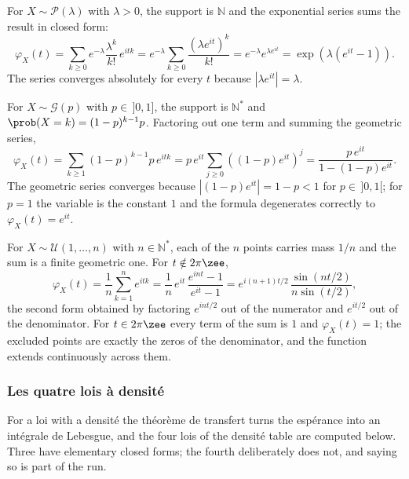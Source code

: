 \begin{example}
For $X \sim \mathcal{P}(\lambda)$ with $\lambda > 0$, the support is $\mathbb{N}$ and the
exponential series sums the result in closed form:
\[
  \varphi_{X}(t) = \sum_{k \geq 0} e^{-\lambda}\frac{\lambda^{k}}{k!}\,e^{itk} =
  e^{-\lambda} \sum_{k \geq 0} \frac{\left(\lambda e^{it}\right)^{k}}{k!} = e^{-\lambda}
  e^{\lambda e^{it}} = \exp\!\left(\lambda\left(e^{it} - 1\right)\right).
\]
The series converges absolutely for every $t$ because $\left|\lambda e^{it}\right| =
\lambda$.
\end{example}

\begin{example}
For $X \sim \mathcal{G}(p)$ with $p \in\, ]0,1]$, the support is $\mathbb{N}^{*}$ and
$\prob(X = k) = (1-p)^{k-1}p$. Factoring out one term and summing the geometric series,
\[
  \varphi_{X}(t) = \sum_{k \geq 1} (1-p)^{k-1} p\, e^{itk} = p\,e^{it} \sum_{j \geq 0}
  \left((1-p)e^{it}\right)^{j} = \frac{p\,e^{it}}{1 - (1-p)e^{it}}.
\]
The geometric series converges because $\left|(1-p)e^{it}\right| = 1 - p < 1$ for $p \in\,
]0,1[$; for $p = 1$ the variable is the constant $1$ and the formula degenerates correctly
to $\varphi_{X}(t) = e^{it}$.
\end{example}

\begin{example}
For $X \sim \mathcal{U}(1,\dots,n)$ with $n \in \mathbb{N}^{*}$, each of the $n$ points
carries mass $1/n$ and the sum is a finite geometric one. For $t \notin 2\pi\zee$,
\[
  \varphi_{X}(t) = \frac{1}{n}\sum_{k=1}^{n} e^{itk} = \frac{1}{n}\, e^{it}\,\frac{e^{int} -
  1}{e^{it} - 1} = e^{i(n+1)t/2}\,\frac{\sin(nt/2)}{n \sin(t/2)},
\]
the second form obtained by factoring $e^{int/2}$ out of the numerator and $e^{it/2}$ out of
the denominator. For $t \in 2\pi\zee$ every term of the sum is $1$ and $\varphi_{X}(t) = 1$;
the excluded points are exactly the zeros of the denominator, and the function extends
continuously across them.
\end{example}

\subsubsection{Les quatre lois à densité}

For a loi with a densité the théorème de transfert turns the espérance into an intégrale de
Lebesgue, and the four lois of the densité table are computed below. Three have elementary
closed forms; the fourth deliberately does not, and saying so is part of the run.

